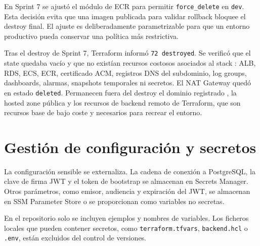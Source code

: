 En Sprint 7 se ajustó el módulo de ECR para permitir \texttt{force\_delete} en \texttt{dev}. Esta decisión evita que una imagen publicada para validar rollback bloquee el destroy final. El ajuste es deliberadamente parametrizable para que un entorno productivo pueda conservar una política más restrictiva.

Tras el destroy de Sprint 7, Terraform informó \texttt{72 destroyed}. Se verificó que el state quedaba vacío y que no existían recursos costosos asociados al stack : ALB, RDS, ECS, ECR, certificado ACM, registros DNS del subdominio, log groups, dashboards, alarmas, snapshots temporales ni secretos. El NAT Gateway quedó en estado \texttt{deleted}. Permanecen fuera del destroy el dominio registrado , la hosted zone pública y los recursos de backend remoto de Terraform, que son recursos base de bajo coste y necesarios para recrear el entorno.

\section{Gestión de configuración y secretos}
\label{sec:configuracion-secretos}

La configuración sensible se externaliza. La cadena de conexión a PostgreSQL, la clave de firma JWT y el token de bootstrap se almacenan en Secrets Manager. Otros parámetros, como emisor, audiencia y expiración del JWT, se almacenan en SSM Parameter Store o se proporcionan como variables no secretas.

En el repositorio solo se incluyen ejemplos y nombres de variables. Los ficheros locales que pueden contener secretos, como \texttt{terraform.tfvars}, \texttt{backend.hcl} o \texttt{.env}, están excluidos del control de versiones.
